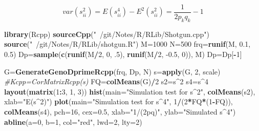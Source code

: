 \documentclass[]{article}
\newenvironment{Shaded}{\begin{snugshade}}{\end{snugshade}}
\newcommand{\CommentTok}[1]{\textcolor[rgb]{0.56,0.35,0.01}{\textit{#1}}}
\newcommand{\DataTypeTok}[1]{\textcolor[rgb]{0.13,0.29,0.53}{#1}}
\newcommand{\DecValTok}[1]{\textcolor[rgb]{0.00,0.00,0.81}{#1}}
\newcommand{\FloatTok}[1]{\textcolor[rgb]{0.00,0.00,0.81}{#1}}
\newcommand{\KeywordTok}[1]{\textcolor[rgb]{0.13,0.29,0.53}{\textbf{#1}}}
\newcommand{\NormalTok}[1]{#1}
\newcommand{\OperatorTok}[1]{\textcolor[rgb]{0.81,0.36,0.00}{\textbf{#1}}}
\newcommand{\StringTok}[1]{\textcolor[rgb]{0.31,0.60,0.02}{#1}}
\begin{document}
\[var(s_{ii}^2)=E(s_{ii}^4)-E^2(s_{ii}^2)=\frac{1}{2p_kq_k}-1\]

\begin{Shaded}
\begin{Highlighting}[]
\KeywordTok{library}\NormalTok{(Rcpp)}
\KeywordTok{sourceCpp}\NormalTok{(}\StringTok{"~/git/Notes/R/RLib/Shotgun.cpp"}\NormalTok{)}
\KeywordTok{source}\NormalTok{(}\StringTok{"~/git/Notes/R/RLib/shotgun.R"}\NormalTok{)}
\NormalTok{M=}\DecValTok{1000}
\NormalTok{N=}\DecValTok{500}
\NormalTok{frq=}\KeywordTok{runif}\NormalTok{(M, }\FloatTok{0.1}\NormalTok{, }\FloatTok{0.5}\NormalTok{)}
\NormalTok{Dp=}\KeywordTok{sample}\NormalTok{(}\KeywordTok{c}\NormalTok{(}\KeywordTok{runif}\NormalTok{(M}\OperatorTok{/}\DecValTok{2}\NormalTok{, }\DecValTok{0}\NormalTok{, }\FloatTok{.5}\NormalTok{), }\KeywordTok{runif}\NormalTok{(M}\OperatorTok{/}\DecValTok{2}\NormalTok{, }\FloatTok{-0.5}\NormalTok{, }\DecValTok{0}\NormalTok{)), M)}
\NormalTok{Dp=Dp[}\OperatorTok{-}\DecValTok{1}\NormalTok{]}

\NormalTok{G=}\KeywordTok{GenerateGenoDprimeRcpp}\NormalTok{(frq, Dp, N)}
\NormalTok{s=}\KeywordTok{apply}\NormalTok{(G, }\DecValTok{2}\NormalTok{, scale)}
\CommentTok{#Kcpp=CorMatrixRcpp(s)}
\NormalTok{FQ=}\KeywordTok{colMeans}\NormalTok{(G)}\OperatorTok{/}\DecValTok{2}
\NormalTok{s2=s}\OperatorTok{^}\DecValTok{2}
\NormalTok{s4=s}\OperatorTok{^}\DecValTok{4}
\KeywordTok{layout}\NormalTok{(}\KeywordTok{matrix}\NormalTok{(}\DecValTok{1}\OperatorTok{:}\DecValTok{3}\NormalTok{, }\DecValTok{1}\NormalTok{, }\DecValTok{3}\NormalTok{))}
\KeywordTok{hist}\NormalTok{(}\DataTypeTok{main=}\StringTok{"Simulation test for s^2"}\NormalTok{, }\KeywordTok{colMeans}\NormalTok{(s2), }\DataTypeTok{xlab=}\StringTok{"E(s^2)"}\NormalTok{)}
\KeywordTok{plot}\NormalTok{(}\DataTypeTok{main=}\StringTok{"Simulation test for s^4"}\NormalTok{, }\DecValTok{1}\OperatorTok{/}\NormalTok{(}\DecValTok{2}\OperatorTok{*}\NormalTok{FQ}\OperatorTok{*}\NormalTok{(}\DecValTok{1}\OperatorTok{-}\NormalTok{FQ)), }\KeywordTok{colMeans}\NormalTok{(s4), }\DataTypeTok{pch=}\DecValTok{16}\NormalTok{, }\DataTypeTok{cex=}\FloatTok{0.5}\NormalTok{, }\DataTypeTok{xlab=}\StringTok{"1/(2pq)"}\NormalTok{, }\DataTypeTok{ylab=}\StringTok{"Simulated s^4"}\NormalTok{)}
\KeywordTok{abline}\NormalTok{(}\DataTypeTok{a=}\DecValTok{0}\NormalTok{, }\DataTypeTok{b=}\DecValTok{1}\NormalTok{, }\DataTypeTok{col=}\StringTok{"red"}\NormalTok{, }\DataTypeTok{lwd=}\DecValTok{2}\NormalTok{, }\DataTypeTok{lty=}\DecValTok{2}\NormalTok{)}


\end{Highlighting}
\end{Shaded}
\end{document}
